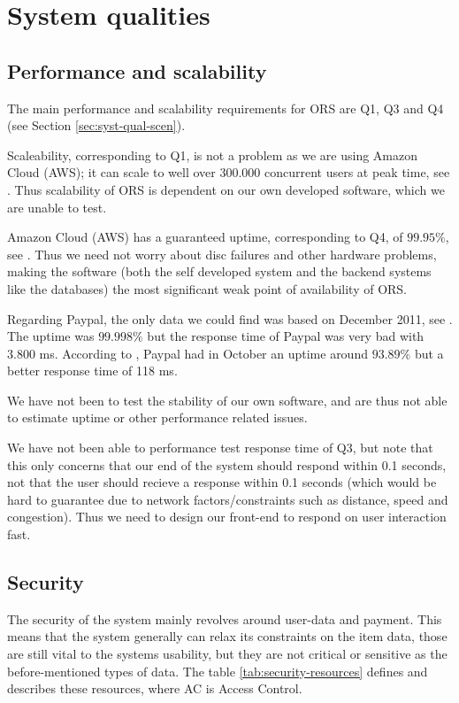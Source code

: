 \chapter{System qualities}
\label{cha:system-qualities}
\thispagestyle{fancy}


\section{Performance and scalability}
\label{sec:perf-scal}
The main performance and scalability requirements for ORS are Q1, Q3 and Q4 (see Section \ref{sec:syst-qual-scen}).

Scaleability, corresponding to Q1, is not a problem as we are using Amazon Cloud (AWS); it can scale to well over 300.000 concurrent users at peak time, see \cite{amazonCaseStudy}. Thus scalability of ORS is dependent on our own developed software, which we are unable to test.

Amazon Cloud (AWS) has a guaranteed uptime, corresponding to Q4, of $99.95\%$, see \cite{amazonSla}. Thus we need not worry about disc failures and other hardware problems, making the software (both the self developed system and the backend systems like the databases) the most significant weak point of availability of ORS.

Regarding Paypal, the only data we could find was based on December 2011, see \cite{pingdom}. The uptime was $99.998\%$ but the response time of Paypal was very bad with 3.800 ms. According to \cite{basicState}, Paypal had in October an uptime around $93.89\%$ but a better response time of 118 ms.

We have not been to test the stability of our own software, and are thus not able to estimate uptime or other performance related issues.

We have not been able to performance test response time of Q3, but note that this only concerns that our end of the system should respond within 0.1 seconds, not that the user should recieve a response within 0.1 seconds (which would be hard to guarantee due to network factors/constraints such as distance, speed and congestion). Thus we need to design our front-end to respond on user interaction fast.


\section{Security}
\label{sec:security}
The security of the system mainly revolves around user-data and payment. This
means that the system generally can relax its constraints on the item data,
those are still vital to the systems usability, but they are not critical or
sensitive as the before-mentioned types of data. The table
\ref{tab:security-resources} defines and describes these resources, where AC is
Access Control.

